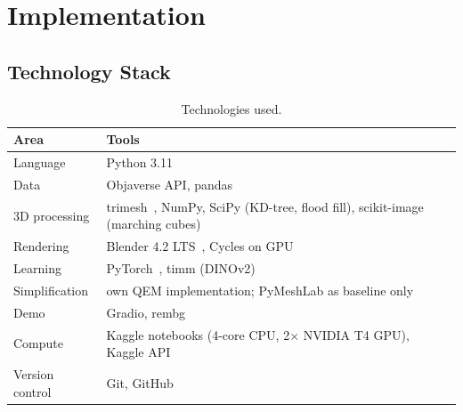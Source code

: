 \chapter{Implementation}

\section{Technology Stack}
\begin{table}[H]
\centering
\caption{Technologies used.}
\small
\begin{tabularx}{\textwidth}{lX}
\toprule
Area & Tools \\
\midrule
Language & Python 3.11 \\
Data & Objaverse API, pandas \\
3D processing & trimesh~\cite{trimesh}, NumPy, SciPy (KD-tree, flood fill), scikit-image (marching cubes) \\
Rendering & Blender 4.2 LTS~\cite{blender}, Cycles on GPU \\
Learning & PyTorch~\cite{paszke2019pytorch}, timm (DINOv2) \\
Simplification & own QEM implementation; PyMeshLab as baseline only \\
Demo & Gradio, rembg \\
Compute & Kaggle notebooks (4-core CPU, 2$\times$ NVIDIA T4 GPU), Kaggle API \\
Version control & Git, GitHub \\
\bottomrule
\end{tabularx}
\end{table}

